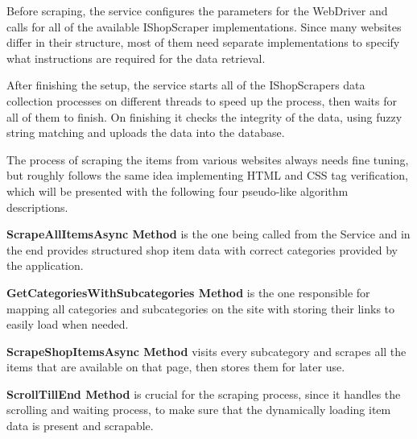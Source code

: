 Before scraping, the service configures the parameters for the WebDriver and calls for all of the available IShopScraper implementations. Since many websites differ in their structure, most of them need separate implementations to specify what instructions are required for the data retrieval. 

After finishing the setup, the service starts all of the IShopScrapers data collection processes on different threads to speed up the process, then waits for all of them to finish. On finishing it checks the integrity of the data, using fuzzy string matching and uploads the data into the database.

The process of scraping the items from various websites always needs fine tuning, but roughly follows the same idea implementing HTML and CSS tag verification, which will be presented with the following four pseudo-like algorithm descriptions.


\noindent\textbf{ScrapeAllItemsAsync Method} is the one being called from the Service and in the end provides structured shop item data with correct categories provided by the application.

\noindent\textbf{GetCategoriesWithSubcategories Method} is the one responsible for mapping all categories and subcategories on the site with storing their links to easily load when needed.

\noindent\textbf{ScrapeShopItemsAsync Method} visits every subcategory and scrapes all the items that are available on that page, then stores them for later use.

\noindent\textbf{ScrollTillEnd Method} is crucial for the scraping process, since it handles the scrolling and waiting process, to make sure that the dynamically loading item data is present and scrapable.

